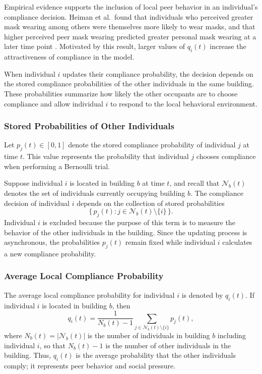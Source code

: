 \documentclass[11pt]{article}
\theoremstyle{definition}
\theoremstyle{plain}
\begin{document}
Empirical evidence supports the inclusion of local peer behavior in an
individual's compliance decision. Heiman et al.\ found that individuals who
perceived greater mask wearing among others were themselves more likely to
wear masks, and that higher perceived peer mask wearing predicted greater
personal mask wearing at a later time point \cite{heiman2023}. Motivated by
this result, larger values of $q_i(t)$ increase the attractiveness of
compliance in the model.

When individual $i$ updates their compliance probability, the decision depends on the stored compliance probabilities of the other individuals in the same building. These probabilities summarize how likely the other occupants are to choose compliance and allow individual $i$ to respond to the local behavioral environment.

\subsubsection{Stored Probabilities of Other Individuals}

Let $p_j(t)\in[0,1]$ denote the stored compliance probability of individual $j$ at time $t$. This value represents the probability that individual $j$ chooses compliance when performing a Bernoulli trial.

Suppose individual $i$ is located in building $b$ at time $t$, and recall that $\mathcal{N}_b(t)$ denotes the set of individuals currently occupying building $b$. The compliance decision of individual $i$ depends on the collection of stored probabilities
\[
\{\,p_j(t) : j\in\mathcal{N}_b(t)\setminus\{i\}\,\}.
\]
Individual $i$ is excluded because the purpose of this term is to measure the behavior of the other individuals in the building. Since the updating process is asynchronous, the probabilities $p_j(t)$ remain fixed while individual $i$ calculates a new compliance probability.

\subsubsection{Average Local Compliance Probability}

The average local compliance probability for individual $i$ is denoted by $q_i(t)$. If individual $i$ is located in building $b$, then
\begin{equation}\label{eq:qi}
q_i(t)
=
\frac{1}{N_b(t)-1}
\sum_{j\in\mathcal{N}_b(t)\setminus\{i\}} p_j(t),
\end{equation}
where $N_b(t)=|\mathcal{N}_b(t)|$ is the number of individuals in building $b$ including individual $i$, so that $N_b(t)-1$ is the number of other individuals in the building. Thus, $q_i(t)$ is the average probability that the other individuals comply; it represents peer behavior and social pressure.
\end{document}
